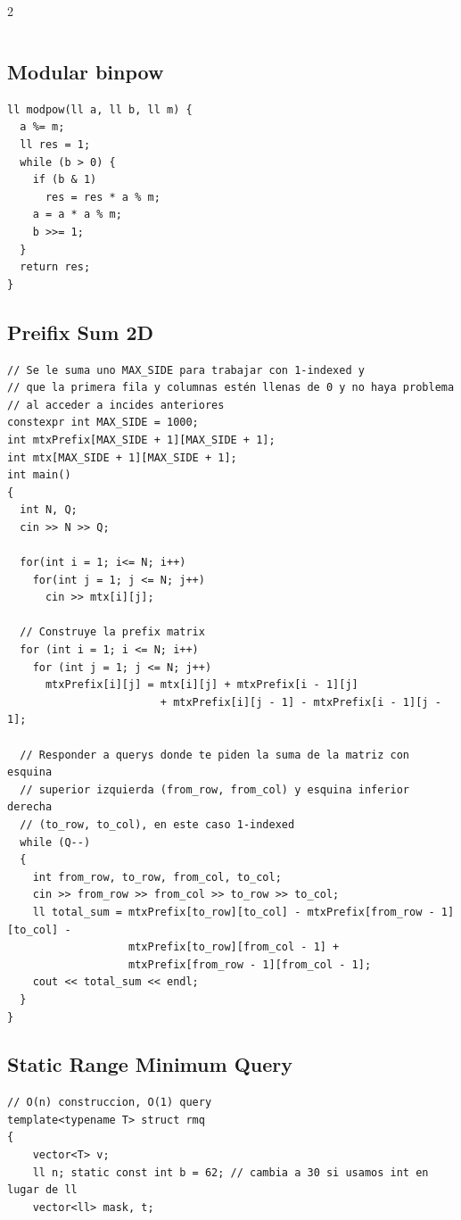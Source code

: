 \documentclass[twoside]{article}
\begin{document}
\begin{multicols*}{2}
\begin{verbatim}
\end{verbatim}

	{
		\subsection*{Modular binpow}
	}
	\begin{verbatim}
ll modpow(ll a, ll b, ll m) {
  a %= m;
  ll res = 1;
  while (b > 0) {
    if (b & 1)
      res = res * a % m;
    a = a * a % m;
    b >>= 1;
  }
  return res;
}
\end{verbatim}

	{
		\subsection*{Preifix Sum 2D}
	}
	\begin{verbatim}
// Se le suma uno MAX_SIDE para trabajar con 1-indexed y
// que la primera fila y columnas estén llenas de 0 y no haya problema
// al acceder a incides anteriores
constexpr int MAX_SIDE = 1000;
int mtxPrefix[MAX_SIDE + 1][MAX_SIDE + 1];
int mtx[MAX_SIDE + 1][MAX_SIDE + 1];
int main()
{
  int N, Q;
  cin >> N >> Q;

  for(int i = 1; i<= N; i++)
    for(int j = 1; j <= N; j++)
      cin >> mtx[i][j]; 
  
  // Construye la prefix matrix
  for (int i = 1; i <= N; i++)
    for (int j = 1; j <= N; j++)
      mtxPrefix[i][j] = mtx[i][j] + mtxPrefix[i - 1][j] 
                        + mtxPrefix[i][j - 1] - mtxPrefix[i - 1][j - 1];

  // Responder a querys donde te piden la suma de la matriz con esquina
  // superior izquierda (from_row, from_col) y esquina inferior derecha
  // (to_row, to_col), en este caso 1-indexed
  while (Q--)
  {
    int from_row, to_row, from_col, to_col;
    cin >> from_row >> from_col >> to_row >> to_col;
    ll total_sum = mtxPrefix[to_row][to_col] - mtxPrefix[from_row - 1][to_col] -
                   mtxPrefix[to_row][from_col - 1] +
                   mtxPrefix[from_row - 1][from_col - 1];
    cout << total_sum << endl;
  }
}
\end{verbatim}

	{
		\subsection*{Static Range Minimum Query}
	}
	\begin{verbatim}
// O(n) construccion, O(1) query
template<typename T> struct rmq
{
    vector<T> v;
    ll n; static const int b = 62; // cambia a 30 si usamos int en lugar de ll
    vector<ll> mask, t;


\end{verbatim}
\end{multicols*}
\end{document}
